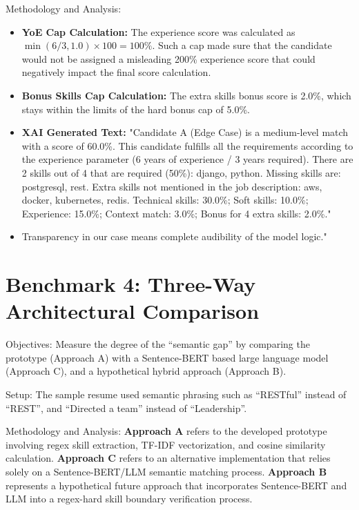 Methodology and Analysis:

\begin{itemize}
    \item \textbf{YoE Cap Calculation:} The experience score was calculated as \(\min(6/3, 1.0)\times 100 = 100\%\). Such a cap made sure that the candidate would not be assigned a misleading 200\% experience score that could negatively impact the final score calculation.
    \item \textbf{Bonus Skills Cap Calculation:} The extra skills bonus score is 2.0\%, which stays within the limits of the hard bonus cap of 5.0\%.
    \item \textbf{XAI Generated Text:} "Candidate A (Edge Case) is a medium-level match with a score of 60.0\%. This candidate fulfills all the requirements according to the experience parameter (6 years of experience / 3 years required). There are 2 skills out of 4 that are required (50\%): django, python. Missing skills are: postgresql, rest. Extra skills not mentioned in the job description: aws, docker, kubernetes, redis. Technical skills: 30.0\%; Soft skills: 10.0\%; Experience: 15.0\%; Context match: 3.0\%; Bonus for 4 extra skills: 2.0\%."
    \item Transparency in our case means complete audibility of the model logic."
\end{itemize}

\section{Benchmark 4: Three-Way Architectural Comparison}
Objectives: Measure the degree of the ``semantic gap'' by comparing the prototype (Approach A) with a Sentence-BERT based large language model (Approach C), and a hypothetical hybrid approach (Approach B).

Setup: The sample resume used semantic phrasing such as ``RESTful'' instead of ``REST'', and ``Directed a team'' instead of ``Leadership''.

Methodology and Analysis: \textbf{Approach A} refers to the developed prototype involving regex skill extraction, TF-IDF vectorization, and cosine similarity calculation. \textbf{Approach C} refers to an alternative implementation that relies solely on a Sentence-BERT/LLM semantic matching process. \textbf{Approach B} represents a hypothetical future approach that incorporates Sentence-BERT and LLM into a regex-hard skill boundary verification process.

